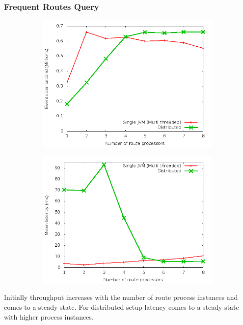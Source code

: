 \documentclass{beamer}
\begin{document}
\begin{frame}
\frametitle{Frequent Routes Query}

\begin{figure}
        \centering
        \begin{subfigure}[b]{0.45\textwidth}
                \includegraphics[width=\textwidth]{throughput_route.png}
        \end{subfigure}
        \begin{subfigure}[b]{0.45\textwidth}
                \includegraphics[width=\textwidth]{latency_route.png}
        \end{subfigure}
\end{figure}

\footnotesize Initially throughput increases with the number of route process instances and comes to a steady state. For distributed setup latency comes to a steady state with higher process instances. 

\end{frame}
\end{document}
